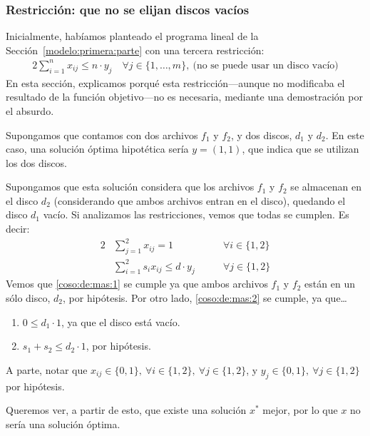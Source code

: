 \documentclass[11pt, a4paper, pdftex]{article}
\begin{document}
\subsubsection{Restricción: que no se elijan discos vacíos}

Inicialmente, habíamos planteado el programa lineal de la
Sección~\ref{modelo:primera:parte} con una tercera restricción:
\begin{alignat*}{2}
    \sum_{i = 1}^{n} x_{ij} \le n\cdot y_{j} \quad \forall j \in \{1,
	\ldots, m\},\ \text{(no se puede usar un disco vacío)}
\end{alignat*}
En esta sección, explicamos porqué esta restricción---aunque no
modificaba el resultado de la función objetivo---no es necesaria,
mediante una demostración por el absurdo.

Supongamos que contamos con dos archivos $f_{1}$ y $f_{2}$, y dos
discos, $d_{1}$ y $d_{2}$. En este caso, una solución óptima hipotética
sería $y = (1, 1)$, que indica que se utilizan los dos discos.

Supongamos que esta solución considera que los archivos $f_{1}$ y
$f_{2}$ se almacenan en el disco $d_{2}$ (considerando que ambos
archivos entran en el disco), quedando el disco $d_{1}$ vacío. Si
analizamos las restricciones, vemos que todas se cumplen. Es decir:
\begin{alignat}{2}
	& \sum_{j = 1}^{2} x_{ij} = 1                     & \qquad \forall i \in \{1, 2\}\label{coso:de:mas:1}\\
	& \sum_{i = 1}^{2} s_{i} x_{ij} \le d \cdot y_{j} & \qquad \forall j \in \{1, 2\}\label{coso:de:mas:2}
\end{alignat}
Vemos que \eqref{coso:de:mas:1} se cumple ya que ambos archivos $f_{1}$ y
$f_{2}$ están en un sólo disco, $d_{2}$, por hipótesis. Por otro lado,
\eqref{coso:de:mas:2} se cumple, ya que\ldots
\begin{enumerate}
	\item $0 \leq d_{1} \cdot 1$, ya que el disco está vacío.
	\item $s_{1} + s_{2} \leq d_{2} \cdot 1$, por hipótesis.
\end{enumerate}
A parte, notar que $x_{ij} \in \{0,1\},\ \forall i \in \{1, 2\},\ \forall j \in \{1, 2\}$,
y $y_{j} \in \{0,1\},\ \forall j \in \{1, 2\}$ por hipótesis. %

Queremos ver, a partir de esto, que existe una solución $x^{*}$ mejor,
por lo que $x$ no sería una solución óptima.
\end{document}
